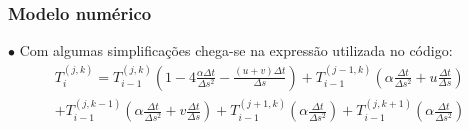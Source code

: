 \documentclass[xcolor=dvipsnames,10pt,aspectratio=169]{beamer}
\begin{document}
	\begin{frame} 
	\frametitle{Modelo numérico}
	$\bullet$ Com algumas simplificações chega-se na expressão utilizada no código:
	\begin{equation}
	\begin{split}
	T_i^{(j,k)} = T_{i -1}^{(j,k)} \left( 1 - 4 \frac{\alpha \Delta t}{\Delta s ^2} - \frac{(u + v) \Delta t}{\Delta s}\right) + T_{i -1}^{(j-1,k)} \left( \alpha \frac{\Delta t}{\Delta s^2} + u \frac{\Delta t}{\Delta s} \right)\\
	+ T_{i -1}^{(j,k-1)} \left( \alpha \frac{\Delta t}{\Delta s^2} + v \frac{\Delta t}{\Delta s} \right) +  T_{i-1}^{(j + 1,k)} \left( \alpha \frac{\Delta t}{\Delta s^2}\right) +  T_{i-1}^{(j,k+1)} \left( \alpha \frac{\Delta t}{\Delta s^2}\right)
	\end{split}
	\end{equation}
	
	\end{frame}
	
	
	
	
	
\end{document}
